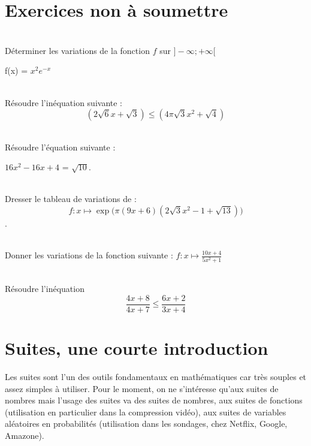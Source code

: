 \documentclass[12pt,fleqn]{report} %
\begin{document}
\chapter*{Exercices non à soumettre}
\begin{exercise}\label{Exercice 25}\text{ }\\
	Déterminer les variations de la fonction $f$ sur $]-\infty;+\infty[$
	
	f(x) = $x^2e^{-x}$
\end{exercise}


\begin{exercise}\label{Exercice 2}\text{ }\\
	{Résoudre l'inéquation suivante :}
	\[
	(2 \sqrt{6} x + \sqrt{3}) \le (4\pi \sqrt{3} x^2 + \sqrt{4})
	\]
\end{exercise}

\begin{exercise}\label{Exercice 9}\text{ }\\
	Résoudre l'équation suivante :
	\bigskip
	\begin{center}
		$16x^2-16x+4$ = $\sqrt{10}$.
	\end{center}
\end{exercise}

\begin{exercise}\label{Exercice 13}\text{ }\\
	Dresser le tableau de variations de : \[f : x \mapsto \exp\big(\pi(9x+6)(2\sqrt{3}x^2-1+\sqrt{13})\big)\].
\end{exercise}

\begin{exercise}\label{Exercice 14}\text{ }\\
	Donner les variations de la fonction suivante : $f : x \mapsto \frac{10x+4}{5x^2+1}$
\end{exercise}
\pagebreak
\begin{exercise}\label{Exercice 30}\text{ }\\
	Résoudre l'inéquation \[\frac{4x+8}{4x+7}\leq\frac{6x+2}{3x+4}\]
	
\end{exercise}


\setcounter{chapter}{5}
\chapter{Suites, une courte introduction}
Les suites sont l'un des outils fondamentaux en mathématiques car très souples et assez simples à utiliser. Pour le moment, on ne s'intéresse qu'aux suites de nombres mais l'usage des suites va des suites de nombres, aux suites de fonctions (utilisation en particulier dans la compression vidéo), aux suites de variables aléatoires en probabilités (utilisation dans les sondages, chez Netflix, Google, Amazone).
\end{document}

